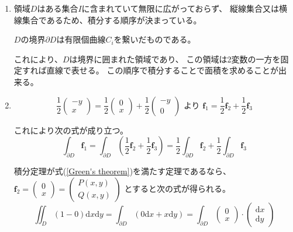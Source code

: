 \documentclass[12pt,b5paper]{ltjsarticle}
\begin{document}
\begin{enumerate}
 \item
      領域$D$はある集合$I$に含まれていて無限に広がっておらず、
      縦線集合又は横線集合であるため、積分する順序が決まっている。

      $D$の境界$\partial D$は有限個曲線$C_i$を繋いだものである。

      これにより、$D$は境界に囲まれた領域であり、
      この領域は2変数の一方を固定すれば直線で表せる。
      この順序で積分することで面積を求めることが出来る。

 \item

      \begin{equation}
       \frac{1}{2}\begin{pmatrix}-y\\x\end{pmatrix}
       =
        \frac{1}{2}
       \begin{pmatrix}0\\x\end{pmatrix}
       +
        \frac{1}{2}
       \begin{pmatrix}-y\\0\end{pmatrix}
      \text{ より }
       \bm{f}_1 = \frac{1}{2}\bm{f}_2 + \frac{1}{2}\bm{f}_3
      \end{equation}

      これにより次の式が成り立つ。
      \begin{equation}
       \int_{\partial D}\bm{f}_1
        =
        \int_{\partial D}\left(\frac{1}{2}\bm{f}_2 + \frac{1}{2}\bm{f}_3\right)
        = \frac{1}{2}\int_{\partial D}\bm{f}_2
        + \frac{1}{2}\int_{\partial D}\bm{f}_3
        \label{area_d}
      \end{equation}




      積分定理が式(\ref{Green's theorem})を満たす定理であるなら、
      $\bm{f}_2=\begin{pmatrix}0\\x\end{pmatrix}=\begin{pmatrix}P(x,y)\\Q(x,y)\end{pmatrix}$
      とすると次の式が得られる。
      \begin{equation}
       \iint_D \left( 1-0 \right)\mathrm{d}x\mathrm{d}y
        = \int_{\partial D}\left( 0\mathrm{d}x + x\mathrm{d}y \right)
        = \int_{\partial D}
           \begin{pmatrix}0\\x\end{pmatrix}\cdot\begin{pmatrix}\mathrm{d}x\\\mathrm{d}y\end{pmatrix}
      \end{equation}


\end{enumerate}
\end{document}
